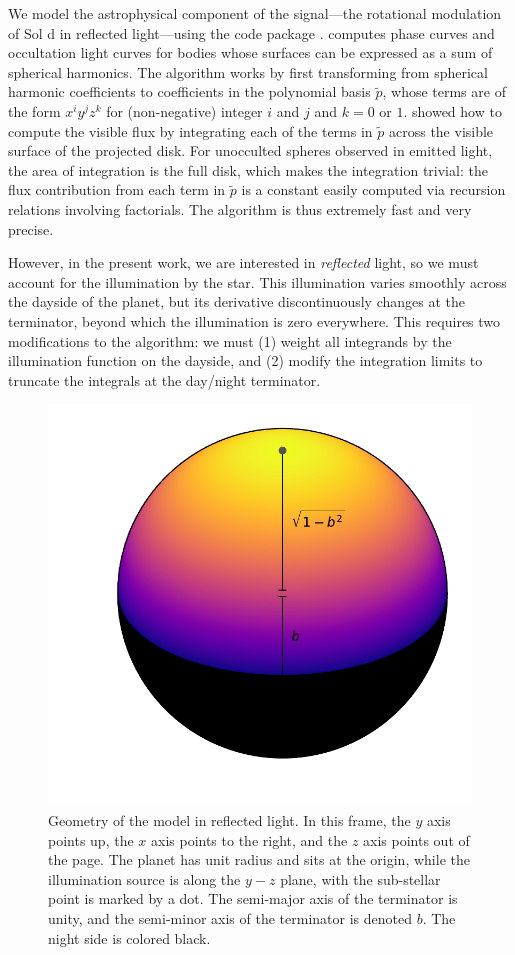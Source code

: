 \documentclass[modern]{aastex62}
\begin{document}
We model the astrophysical component of the signal---the rotational modulation
of Sol d in reflected light---using the \starry code package \citep{Luger2019}.
\starry computes phase curves and occultation light curves for bodies whose
surfaces can be expressed as a sum of spherical harmonics. 
The algorithm works by first transforming
from spherical harmonic coefficients to coefficients in the polynomial basis $\tilde{p}$, whose
terms are of the form $x^i y^j z^k$ for (non-negative) integer $i$ and $j$ 
and $k = 0$ or $1$. \citet{Luger2019} showed how to compute the visible
flux by integrating each of the terms in $\tilde{p}$ across the visible
surface of the projected disk. For unocculted spheres observed in emitted
light, the area of integration is the full disk, which makes the integration
trivial: the flux contribution from each term in $\tilde{p}$ is a constant
easily computed via recursion relations involving factorials. The algorithm is
thus extremely fast and very precise.

However, in the present work, we are interested in \emph{reflected} light, so we must
account for the illumination by the star. This illumination varies smoothly
across the dayside of the planet, but its derivative discontinuously changes at the 
terminator, beyond which the illumination is zero everywhere. This requires
two modifications to the \starry algorithm: we must (1) weight all integrands
by the illumination function on the dayside, and (2) modify the integration
limits to truncate the integrals at the day/night terminator.

\begin{figure}[t!]
    \begin{centering}
    \includegraphics[width=0.4\linewidth]{figures/geometry.pdf}
    \caption{\label{fig:geometry}
             Geometry of the \starry model in reflected light. In this frame, 
             the $y$ axis points up, 
             the $x$ axis points to the right, and the $z$ axis points out of the page.
             The planet has unit radius and sits at the origin, while
             the illumination source is along the $y-z$ plane, with the sub-stellar point is
             marked by a dot. The semi-major axis of the terminator is unity, and
             the semi-minor axis of the terminator is denoted $b$. The night side
             is colored black.
             }
    \end{centering}
\end{figure}
\end{document}
